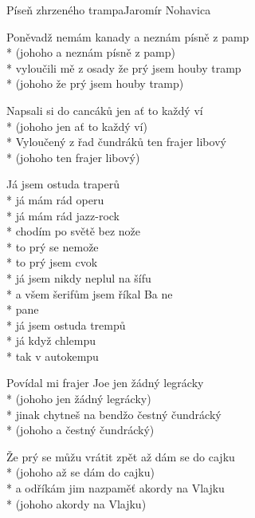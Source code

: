 \documentclass[10.5pt]{book}
\begin{document}
\begin{poem}{Píseň zhrzeného trampa}{Jaromír Nohavica}

\settowidth{\versewidth}{Že prý se můžu vrátit zpět až dám se do cajku}

\begin{altverse}
Poněvadž nemám kanady
a neznám písně z pamp\\*
(johoho a neznám písně z pamp)\\*
vyloučili mě z osady
že prý jsem houby tramp\\*
(johoho že prý jsem houby tramp)
\end{altverse}

\begin{altverse}
Napsali si do cancáků
jen ať to každý ví\\*
(johoho jen ať to každý ví)\\*
Vyloučený z řad čundráků
ten frajer libový\\*
(johoho ten frajer libový)
\end{altverse}

Já jsem ostuda traperů\\*
já mám rád operu\\*
já mám rád jazz-rock\\*
chodím po světě bez nože\\*
to prý se nemože\\*
to prý jsem cvok\\*
já jsem nikdy neplul na šífu\\*
a všem šerifům jsem říkal Ba ne\\*
pane\\*
já jsem ostuda trempů\\*
já když chlempu\\*
tak v autokempu

\begin{altverse}
Povídal mi frajer Joe
jen žádný legrácky\\*
(johoho jen žádný legrácky)\\*
jinak chytneš na bendžo
čestný čundrácký\\*
(johoho a čestný čundrácký)
\end{altverse}

\begin{altverse}
Že prý se můžu vrátit zpět
až dám se do cajku\\*
(johoho až se dám do cajku)\\*
a odříkám jim nazpaměť
akordy na Vlajku\\*
(johoho akordy na Vlajku)
\end{altverse}


\end{poem}
\end{document}
